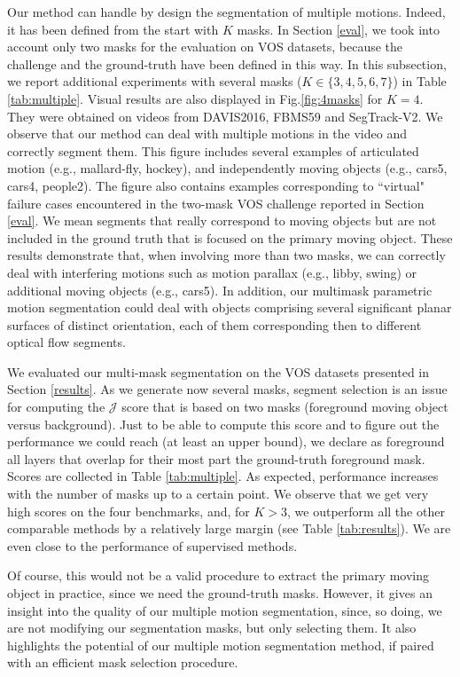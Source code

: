 \documentclass[10pt,twocolumn,letterpaper]{article}
\begin{document}
Our method can handle by design the segmentation of multiple motions. Indeed, it has been defined from the start with $K$ masks. In Section \ref{eval}, we took into account only two masks for the evaluation on VOS datasets, because the challenge and the ground-truth have been defined in this way. In this subsection, we report additional experiments with {\color{black} several masks ($K\in \{3,4,5,6,7\}$) in Table \ref{tab:multiple}. Visual results are also displayed in Fig.\ref{fig:4masks} for $K=4$}. They were obtained on videos from DAVIS2016, FBMS59 and SegTrack-V2. We observe that our method can deal with multiple motions in the video and correctly segment them. This figure includes several examples of articulated motion (e.g., mallard-fly, hockey), and independently moving objects (e.g., cars5, cars4, people2). The figure also contains examples corresponding to ``virtual" failure cases encountered in the two-mask VOS challenge reported in Section \ref{eval}. We mean segments that really correspond to moving objects but are not included in the ground truth that is focused on the primary moving object.
These results demonstrate that, when involving {\color{black} more than two} masks, we can correctly deal with interfering motions such as motion parallax (e.g., libby, swing) or additional moving objects (e.g., cars5). {\color{black} In addition, our multimask parametric motion segmentation could deal with objects comprising several significant planar surfaces of distinct orientation, each of them corresponding then to different optical flow segments.}

{\color{black} We evaluated our multi-mask segmentation on the VOS datasets presented in Section \ref{results}}. As we generate now several masks, segment selection is an issue for computing the $\mathcal{J}$ score that is based on two masks (foreground moving object versus background). Just to be able to compute this score and to figure out the performance we could reach (at least an upper bound), we declare as foreground all layers that overlap for their most part the ground-truth foreground mask. Scores are collected in Table \ref{tab:multiple}. {\color{black} As expected, performance increases with the number of masks up to a certain point.} We observe that we get very high scores on the four benchmarks, {\color{black} and, for $K>3$, we outperform} all the other comparable methods by a relatively large margin (see Table \ref{tab:results}). We are even close to the performance of supervised methods.

Of course, this would not be a valid procedure to extract the primary moving object in practice, since we need the ground-truth masks. However, it gives an insight into the quality of our multiple motion segmentation, since, so doing, we are not modifying our segmentation masks, but only selecting them. It also highlights the potential of our multiple motion segmentation method, if paired with an efficient mask selection procedure.
\end{document}
